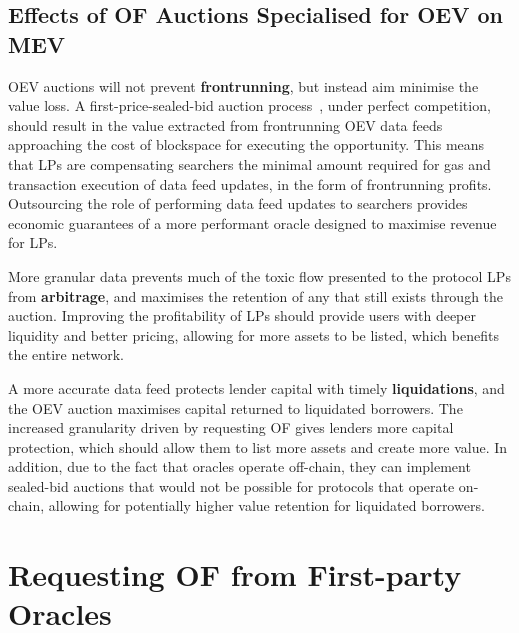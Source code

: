 \documentclass[11pt]{article}
\begin{document}
\subsection{Effects of OF Auctions Specialised for OEV on MEV}

OEV auctions will not prevent \textbf{frontrunning}, but instead aim minimise the value loss.
A first-price-sealed-bid auction process~\cite{fpsba}, under perfect competition, should result in the value extracted from frontrunning OEV data feeds approaching the cost of blockspace for executing the opportunity.
This means that LPs are compensating searchers the minimal amount required for gas and transaction execution of data feed updates, in the form of frontrunning profits.
Outsourcing the role of performing data feed updates to searchers provides economic guarantees of a more performant oracle designed to maximise revenue for LPs.

More granular data prevents much of the toxic flow presented to the protocol LPs from \textbf{arbitrage}, and maximises the retention of any that still exists through the auction.
Improving the profitability of LPs should provide users with deeper liquidity and better pricing, allowing for more assets to be listed, which benefits the entire network.

A more accurate data feed protects lender capital with timely \textbf{liquidations}, and the OEV auction maximises capital returned to liquidated borrowers.
The increased granularity driven by requesting OF gives lenders more capital protection, which should allow them to list more assets and create more value.
In addition, due to the fact that oracles operate off-chain, they can implement sealed-bid auctions that would not be possible for protocols that operate on-chain, allowing for potentially higher value retention for liquidated borrowers. 

\section{Requesting OF from First-party Oracles}
\end{document}
